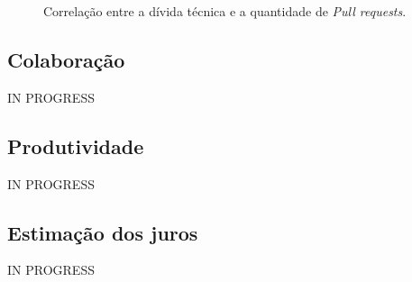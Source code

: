  \begin{figure}[H]
  \centering
  \caption{Correlação entre a dívida técnica e a quantidade de \textit{Pull requests}.}
  \label{fig:correlacao_divida_pull_request} 
\end{figure}


\subsection{Colaboração}

IN PROGRESS

\subsection{Produtividade}

IN PROGRESS

\subsection{Estimação dos juros}

IN PROGRESS







